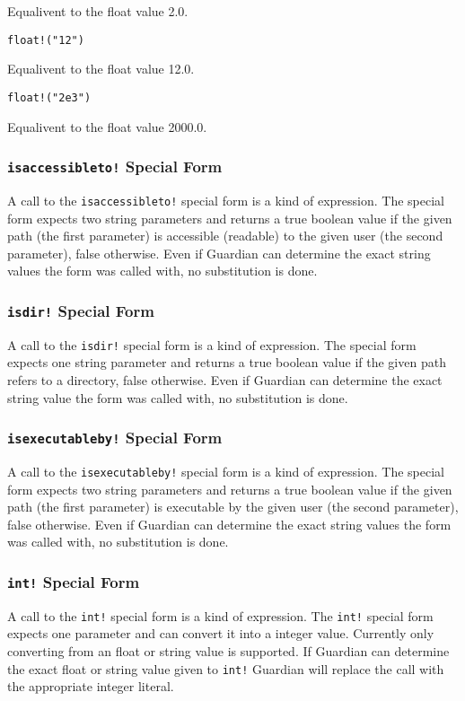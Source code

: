 {{\begin{itemize}
{				Equalivent to the float value 2.0.
			
			\item \texttt{float!("12")}
			
				Equalivent to the float value 12.0.
			
			\item \texttt{float!("2e3")}
			
				Equalivent to the float value 2000.0.
		}
		\end{itemize}
	}
	
	\subsubsection{\texttt{isaccessibleto!} Special Form}
	{
		A call to the \texttt{isaccessibleto!} special form
		is a kind of expression.
		The special form expects two string parameters and returns a true boolean
		value if the given path (the first parameter) is accessible (readable) to
		the given user (the second parameter), false
		otherwise.
		Even if Guardian can determine the exact string values the form was
		called with, no substitution is done.
	}
	
	\subsubsection{\texttt{isdir!} Special Form}
	{
		A call to the \texttt{isdir!} special form is a kind of expression.
		The special form expects one string parameter and returns a true boolean
		value if the given path refers to a directory, false
		otherwise.
		Even if Guardian can determine the exact string value the form was
		called with, no substitution is done.
	}
	
	\subsubsection{\texttt{isexecutableby!} Special Form}
	{
		A call to the \texttt{isexecutableby!} special form
		is a kind of expression.
		The special form expects two string parameters and returns a true boolean
		value if the given path (the first parameter) is executable by
		the given user (the second parameter), false
		otherwise.
		Even if Guardian can determine the exact string values the form was
		called with, no substitution is done.
	}

	\subsubsection{\texttt{int!} Special Form}
	{
		A call to the \texttt{int!} special form is a kind of expression.
		The \texttt{int!} special form expects one parameter and can convert it
		into a integer value. Currently only converting from an float or string
		value is supported.
		If Guardian can determine the exact float or string value given to
		\texttt{int!} Guardian will replace the call with the appropriate
		integer literal.
		
}}

